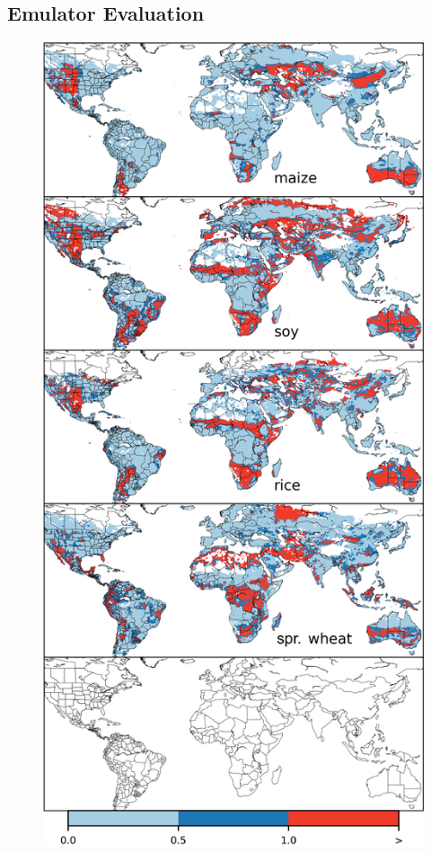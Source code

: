 \documentclass[10pt]{article}
\begin{document}
\subsection{Emulator Evaluation}
\begin{figure}[h!]
\centering
\begin{minipage}{.45\textwidth}
\centering
\includegraphics[width=\textwidth]{s_em_err_JULES.png}\\

\end{minipage}
\end{figure}
\end{document}
